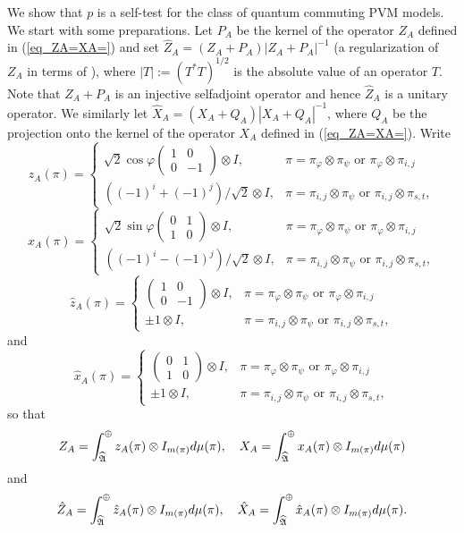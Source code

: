 \documentclass[11pt]{amsart}
\theoremstyle{definition}
\begin{document}
We show that $p$ is a self-test for 
the class of quantum commuting PVM models. We start with some preparations. 
Let $P_A$ be the kernel of the operator $Z_A$ 
defined in (\ref{eq_ZA=XA=}) and set $\hat Z_A=(Z_A+P_A)|Z_A+P_A|^{-1}$ (a regularization of $Z_A$ in terms of \cite[A.2]{supic-bowles}), 
where $|T| := (T^*T)^{1/2}$ is the absolute value of an operator $T$. Note that $Z_A+P_A$ is an injective selfadjoint operator and hence $\hat Z_A$ is a unitary operator. We similarly let 
$\hat X_A=(X_A+Q_A)|X_A+Q_A|^{-1}$, where $Q_A$ be the projection onto 
the kernel of the operator $X_A$ defined in (\ref{eq_ZA=XA=}). 
Write 
$$z_A(\pi)=\left\{\begin{array}{ll}\sqrt{2}\cos\varphi\left(\begin{array}{cc}1&0\\0&-1\end{array}\right)\otimes I,& 
\pi = \pi_{\varphi}\otimes\pi_{\psi}\text{ or }\pi_{\varphi}\otimes\pi_{i,j}\\
((-1)^{i}+(-1)^j)/\sqrt{2}\otimes I,& \pi=\pi_{i,j}\otimes\pi_{\psi}\text{ or }\pi_{i,j}\otimes\pi_{s,t},
\end{array}\right.$$
$$ x_A(\pi)=\left\{\begin{array}{ll}\sqrt{2}\sin\varphi\left(\begin{array}{cc}0&1\\1&0\end{array}\right)\otimes I,
& \pi = \pi_{\varphi}\otimes\pi_{\psi}\text{ or }
\pi_{\varphi}\otimes\pi_{i,j}\\
((-1)^{i}-(-1)^j)/\sqrt{2}\otimes I,& \pi=\pi_{i,j}\otimes\pi_{\psi}\text{ or }\pi_{i,j}\otimes\pi_{s,t},
\end{array}\right.$$
$$\hat z_A(\pi)=\left\{\begin{array}{ll}\left(\begin{array}{cc}1&0\\0&-1\end{array}\right)\otimes I,& \pi=\pi_{\varphi}\otimes\pi_{\psi}\text{ or }\pi_{\varphi}\otimes\pi_{i,j}\\
\pm 1\otimes I,& \pi=\pi_{i,j}\otimes\pi_{\psi}\text{ or }\pi_{i,j}\otimes\pi_{s,t},
\end{array}\right.$$
and
$$\hat x_A(\pi)=\left\{\begin{array}{ll}\left(\begin{array}{cc}0&1\\1&0\end{array}\right)\otimes I,& \pi=\pi_{\varphi}\otimes\pi_{\psi}\text{ or }\pi_{\varphi}\otimes\pi_{i,j}\\
\pm 1\otimes I,& \pi=\pi_{i,j}\otimes\pi_{\psi}\text{ or }\pi_{i,j}\otimes\pi_{s,t},
\end{array}\right.$$
so that 
$$Z_A=\int_{\widehat{\frak A}}^\oplus z_A(\pi)\otimes I_{m(\pi)}d\mu(\pi),\quad  X_A=\int_{\widehat{\frak A}}^\oplus x_A(\pi)\otimes I_{m(\pi)}d\mu(\pi)$$
and 
$$\hat Z_A=\int_{\widehat{\frak A}}^\oplus\hat z_A(\pi)\otimes I_{m(\pi)}d\mu(\pi),\quad  \hat X_A=\int_{\widehat{\frak A}}^\oplus\hat x_A(\pi)\otimes I_{m(\pi)}d\mu(\pi).$$
\end{document}
